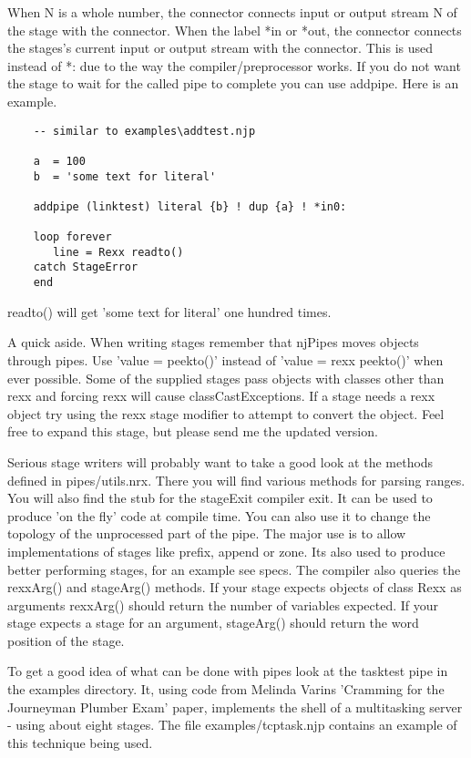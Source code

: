 When N is a whole number, the connector connects input or output stream N of the stage with the connector.
When the label *in or *out, the connector connects the stages's current input or output stream with the connector.  This is used instead of *: due to the way the compiler/preprocessor works.
If you do not want the stage to wait for the called pipe to complete you can use addpipe.  Here is an example.
\begin{lstlisting}
    -- similar to examples\addtest.njp

    a  = 100
    b  = 'some text for literal'

    addpipe (linktest) literal {b} ! dup {a} ! *in0:

    loop forever
       line = Rexx readto()
    catch StageError
    end
\end{lstlisting}
    readto() will get 'some text for literal' one hundred times.

A quick aside.  When writing stages remember that njPipes moves objects through pipes.  Use 'value = peekto()' instead of 'value = rexx peekto()' when ever possible.  Some of the supplied stages pass objects with classes other than rexx and forcing rexx will cause classCastExceptions. If a stage needs a rexx object try using the rexx stage modifier to attempt to convert the object.  Feel free to expand this stage, but please send me the updated version.

Serious stage writers will probably want to take a good look at the methods defined in pipes/utils.nrx.  There you will find various methods for parsing ranges.  You will also find the stub for the stageExit compiler exit.  It can be used to produce 'on the fly' code at compile time.  You can also use it to change the topology of the unprocessed part of the pipe.  The major use is to allow implementations of stages like prefix, append or zone.  Its also used to produce better performing stages, for an example see specs.
The compiler also queries the rexxArg() and stageArg() methods.  If your stage expects objects of class Rexx as arguments rexxArg() should return the number of variables expected.  If your stage expects a stage for an argument, stageArg() should return the word position of the stage.

To get a good idea of what can be done with pipes look at the tasktest pipe in the examples directory.  It, using code from Melinda Varins 'Cramming for the Journeyman Plumber Exam' paper,  implements the shell of a  multitasking server - using about eight stages.  The file examples/tcptask.njp contains an example of this technique being used.

